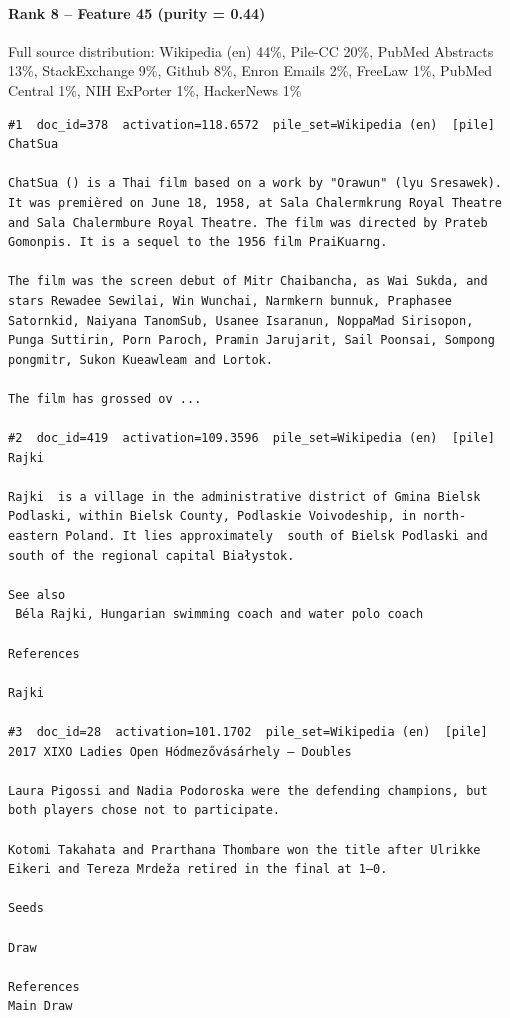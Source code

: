 \paragraph*{Rank 8 -- Feature 45 (purity = 0.44)}

Full source distribution: Wikipedia (en) 44\%, Pile-CC 20\%, PubMed Abstracts 13\%, StackExchange 9\%, Github 8\%, Enron Emails 2\%, FreeLaw 1\%, PubMed Central 1\%, NIH ExPorter 1\%, HackerNews 1\%

\begin{verbatim}
#1  doc_id=378  activation=118.6572  pile_set=Wikipedia (en)  [pile]
ChatSua

ChatSua () is a Thai film based on a work by "Orawun" (lyu Sresawek). It was premièred on June 18, 1958, at Sala Chalermkrung Royal Theatre and Sala Chalermbure Royal Theatre. The film was directed by Prateb Gomonpis. It is a sequel to the 1956 film PraiKuarng.

The film was the screen debut of Mitr Chaibancha, as Wai Sukda, and stars Rewadee Sewilai, Win Wunchai, Narmkern bunnuk, Praphasee Satornkid, Naiyana TanomSub, Usanee Isaranun, NoppaMad Sirisopon, Punga Suttirin, Porn Paroch, Pramin Jarujarit, Sail Poonsai, Sompong pongmitr, Sukon Kueawleam and Lortok.

The film has grossed ov ...

#2  doc_id=419  activation=109.3596  pile_set=Wikipedia (en)  [pile]
Rajki

Rajki  is a village in the administrative district of Gmina Bielsk Podlaski, within Bielsk County, Podlaskie Voivodeship, in north-eastern Poland. It lies approximately  south of Bielsk Podlaski and  south of the regional capital Białystok.

See also
 Béla Rajki, Hungarian swimming coach and water polo coach

References

Rajki

#3  doc_id=28  activation=101.1702  pile_set=Wikipedia (en)  [pile]
2017 XIXO Ladies Open Hódmezővásárhely – Doubles

Laura Pigossi and Nadia Podoroska were the defending champions, but both players chose not to participate.

Kotomi Takahata and Prarthana Thombare won the title after Ulrikke Eikeri and Tereza Mrdeža retired in the final at 1–0.

Seeds

Draw

References
Main Draw


\end{verbatim}
